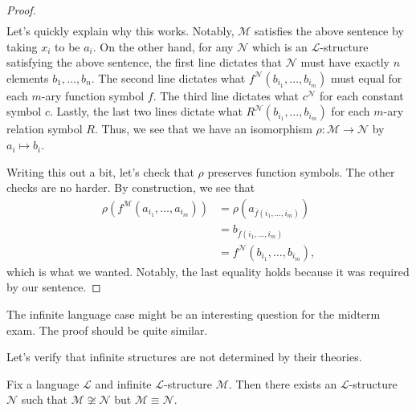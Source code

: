 \documentclass[../notes.tex]{subfiles}
\begin{document}
\begin{proof}
\begin{align*}
	\end{align*}
	Let's quickly explain why this works. Notably, $\mathcal M$ satisfies the above sentence by taking $x_i$ to be $a_i$. On the other hand, for any $\mathcal N$ which is an $\mathcal L$-structure satisfying the above sentence, the first line dictates that $\mathcal N$ must have exactly $n$ elements $b_1,\ldots,b_n$. The second line dictates what $f^\mathcal N(b_{i_1},\ldots,b_{i_m})$ must equal for each $m$-ary function symbol $f$. The third line dictates what $c^\mathcal N$ for each constant symbol $c$. Lastly, the last two lines dictate what $R^\mathcal N(b_{i_1},\ldots,b_{i_m})$ for each $m$-ary relation symbol $R$. Thus, we see that we have an isomorphism $\rho\colon\mathcal M\to\mathcal N$ by $a_i\mapsto b_i$.

	Writing this out a bit, let's check that $\rho$ preserves function symbols. The other checks are no harder. By construction, we see that
	\begin{align*}
		\rho\left(f^\mathcal M(a_{i_1},\ldots,a_{i_m})\right) &= \rho\left(a_{\overline f(i_1,\ldots,i_m)}\right) \\
		&= b_{\overline f(i_1,\ldots,i_m)} \\
		&= f^\mathcal N(b_{i_1},\ldots,b_{i_m}),
	\end{align*}
	which is what we wanted. Notably, the last equality holds because it was required by our sentence.
\end{proof}
\begin{remark}
	The infinite language case might be an interesting question for the midterm exam. The proof should be quite similar.
\end{remark}
Let's verify that infinite structures are not determined by their theories.
\begin{proposition}
	Fix a language $\mathcal L$ and infinite $\mathcal L$-structure $\mathcal M$. Then there exists an $\mathcal L$-structure $\mathcal N$ such that $\mathcal M\not\cong\mathcal N$ but $\mathcal M\equiv\mathcal N$.
\end{proposition}
\end{document}
